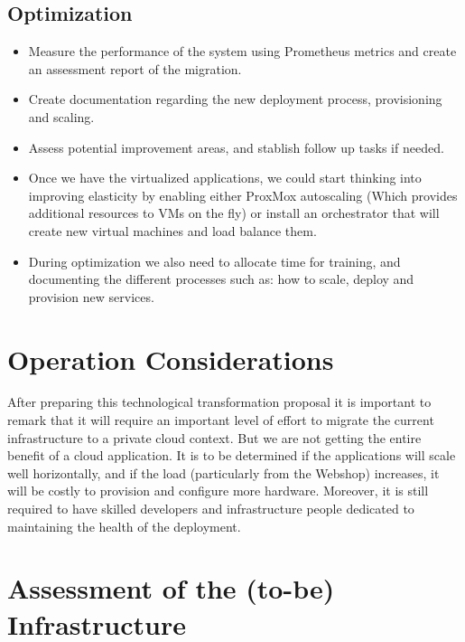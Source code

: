 \documentclass{llncs}
\begin{document}
\subsection{Optimization}

\begin{itemize}
  \item Measure the performance of the system using Prometheus metrics and create an assessment report of the migration.
        
  \item Create documentation regarding the new deployment process, provisioning and scaling.
        
  \item Assess potential improvement areas, and stablish follow up tasks if needed.
        
  \item Once we have the virtualized applications, we could start thinking into improving elasticity by enabling either ProxMox autoscaling (Which provides additional resources to VMs on the fly) or install an orchestrator that will create new virtual machines and load balance them.
        
  \item During optimization we also need to allocate time for training, and documenting the different processes such as: how to scale, deploy and provision new services.
\end{itemize}

\section{Operation Considerations}

After preparing this technological transformation proposal it is important to remark that it will require an important level of effort to migrate the current infrastructure to a private cloud context. But we are not getting the entire benefit of a cloud application. It is to be determined if the applications will scale well horizontally, and if the load (particularly from the Webshop) increases, it will be costly to provision and configure more hardware. Moreover, it is still required to have skilled developers and infrastructure people dedicated to maintaining the health of the deployment.  

\section{Assessment of the (to-be) Infrastructure}
\end{document}
